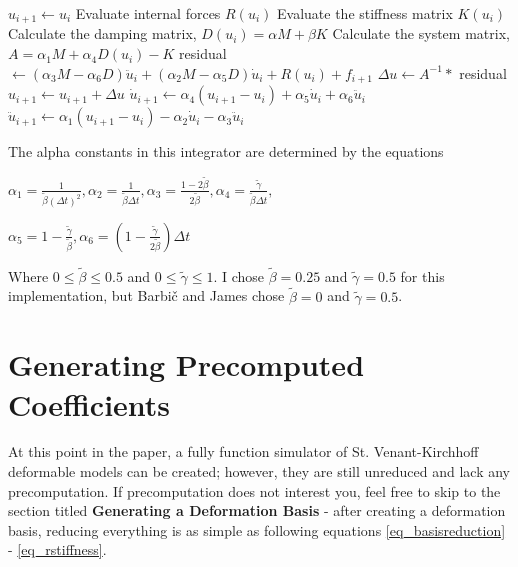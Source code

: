 \documentclass[twocolumn,10pt]{asme2ej}
\begin{document}
\begin{algorithmic}[1]
      \State $u_{i + 1} \gets u_i$
      \State Evaluate internal forces $R(u_i)$
      \State Evaluate the stiffness matrix $K(u_i)$
      \State Calculate the damping matrix, $D(u_i) = \alpha M + \beta K$
      \State Calculate the system matrix, $A = \alpha_1M + \alpha_4D(u_i) - K$
      \State residual $\gets (\alpha_3M - \alpha_6D)\ddot u_{i} + (\alpha_2M - \alpha_5D)\dot u_{i} + R(u_i) + f_{i+1}$
      \State $ \Delta u \gets A^{-1} *$ residual
      \State $ u_{i + 1} \gets u_{i + 1} + \Delta u$
      \State $ \dot u_{i + 1} \gets \alpha_4(u_{i+1} - u_i) + \alpha_5 \dot u_i + \alpha_6 \ddot u_i$
      \State $ \ddot u_{i + 1} \gets \alpha_1(u_{i+1} - u_i) - \alpha_2 \dot u_i - \alpha_3 \ddot u_i$
    \EndFunction
\end{algorithmic}

The alpha constants in this integrator are determined by the equations

\begin{center}
$\alpha_1 = \frac{1}{\tilde{\beta}(\Delta t)^2}, \alpha_2 = \frac{1}{\tilde{\beta}\Delta t},
\alpha_3 = \frac{1 - 2\tilde{\beta}}{2\tilde{\beta}}, \alpha_4 = \frac{\tilde{\gamma}}{\tilde{\beta}\Delta t},$

$\alpha_5 = 1 - \frac{\tilde{\gamma}}{\tilde{\beta}}, \alpha_6 = (1 - \frac{\tilde{\gamma}}{2\tilde{\beta}})\Delta t$
\end{center}

Where $0 \leq \tilde{\beta} \leq 0.5$ and $0 \leq \tilde{\gamma} \leq 1$. I chose $\tilde{\beta} = 0.25$ and $\tilde{\gamma} = 0.5$ for this implementation, but Barbič and James chose $\tilde{\beta} = 0$ and $\tilde{\gamma} = 0.5$.

\section{Generating Precomputed Coefficients}

At this point in the paper, a fully function simulator of St. Venant-Kirchhoff deformable models can be created; however, they are still unreduced and lack any precomputation. If precomputation does not interest you, feel free to skip to the section titled \textbf{Generating a Deformation Basis} - after creating a deformation basis, reducing everything is as simple as following equations \ref{eq_basisreduction} - \ref{eq_rstiffness}.
\end{document}
